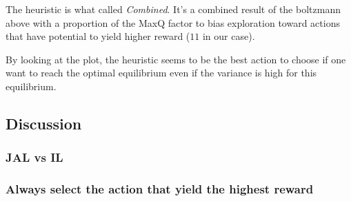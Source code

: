 \documentclass[11pt]{article}
\begin{document}
The heuristic is what \cite{bestref} called \textit{Combined}. It's a combined result of the boltzmann above with a proportion of the MaxQ factor to bias exploration toward actions that have potential to yield higher reward ($11$ in our case).

By looking at the plot, the heuristic seems to be the best action to choose if one want to reach the optimal equilibrium even if the variance is high for this equilibrium.


\subsection{Discussion}

\subsubsection{JAL vs IL}


\subsubsection{Always select the action that yield the highest reward}


\printbibliography
\end{document}
